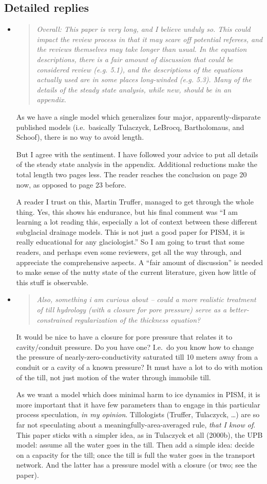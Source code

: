 \documentclass[11pt,reqno]{amsart}
\newcommand{\reply}[2]{
\medskip\medskip
\item  \begin{quote}
\emph{#1}
\end{quote}

\medskip
\noindent #2}
\begin{document}
\subsection*{Detailed replies}  
\begin{itemize}
\reply{Overall: This paper is very long, and I believe unduly so. This could impact the review process in that it may scare off potential referees, and the reviews themselves may take longer than usual. In the equation descriptions, there is a fair amount of discussion that could be considered review (e.g. 5.1), and the descriptions of the equations actually used are in some places long-winded (e.g. 5.3). Many of the details of the steady state analysis, while new, should be in an appendix.}{As we have a single model which generalizes four major, apparently-disparate published models (i.e.~basically Tulaczyck, LeBrocq, Bartholomaus, and Schoof), there is no way to avoid length.

\medskip
But I agree with the sentiment.  I have followed your advice to put all details of the steady state analysis in the appendix.  Additional reductions make the total length two pages less.  The reader reaches the conclusion on page 20 now, as opposed to page 23 before.

\medskip
A reader I trust on this, Martin Truffer, managed to get through the whole thing.  Yes, this shows his endurance, but his final comment was ``I am learning a lot reading this, especially a lot of context between these different subglacial drainage models. This is not just a good paper for PISM, it is really educational for any glaciologist.''  So I am going to trust that some readers, and perhaps even some reviewers, get all the way through, and appreciate the comprehensive aspects.  A ``fair amount of discussion'' is needed to make sense of the nutty state of the current literature, given how little of this stuff is observable.}

\reply{Also, something i am curious about -- could a more realistic treatment of till hydrology (with a closure for pore pressure) serve as a better-constrained regularization of the thickness equation?}{It would be nice to have a closure for pore pressure that relates it to cavity/conduit pressure.  Do you have one?  I.e.~do you know how to change the pressure of nearly-zero-conductivity saturated till 10 meters away from a conduit or a cavity of a known pressure?  It must have a lot to do with motion of the till, not just motion of the water through immobile till.

\medskip
As we want a model which does minimal harm to ice dynamics in PISM, it is more important that it have few parameters than to engage in this particular process speculation, \emph{in my opinion}.  Tillologists (Truffer, Tulaczyck, \dots) are so far not speculating about a meaningfully-area-averaged rule, \emph{that I know of}.  This paper sticks with a simpler idea, as in Tulaczyck et all (2000b), the UPB model: assume all the water goes in the till.  Then add a simple idea: decide on a capacity for the till; once the till is full the water goes in the transport network.  And the latter has a pressure model with a closure (or two; see the paper).

}
\end{itemize}
\end{document}
